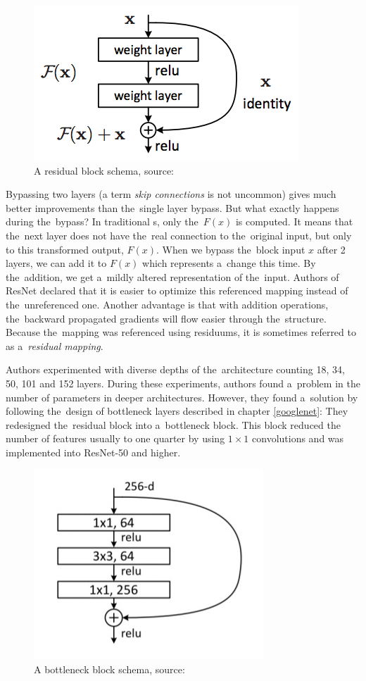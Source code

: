 \begin{figure}[H]
   \centering
	\includegraphics[width=0.4\linewidth]{./pictures/residual-block.png}
	\caption[Residual block]{A residual block schema, source: \cite{resnet}}
      \label{fig:res-block}
\end{figure}

Bypassing two layers (a term \textit{skip connections} is not uncommon) gives 
much better improvements than the~single layer bypass. But what exactly happens
during the~bypass? In traditional s, only the~$F(x)$ is computed. It 
means that the~next layer does not have the~real connection to the~original 
input, but only to this transformed output, $F(x)$. When we bypass the~block 
input $x$ after 2 layers, we can add it to $F(x)$ which represents a~change
this time. By the~addition, we get a~mildly altered representation of
the~input. Authors of ResNet declared that it is easier to optimize this
referenced mapping instead of the~unreferenced one. Another advantage is that
with addition operations, the~backward propagated gradients will flow easier
through the~structure. Because the~mapping was referenced using residuums, it
is sometimes referred to as a~\textit{residual mapping}.

Authors experimented with diverse depths of the~architecture counting 18, 34, 
50, 101 and 152 layers. During these experiments, authors found a~problem in
the number of parameters in deeper architectures. However, they found
a~solution by following the~design of bottleneck layers described in chapter
\ref{googlenet}: They redesigned the~residual block into a~bottleneck block.
This block reduced the number of features usually to one quarter by using
$1 \times 1$ convolutions and was implemented into ResNet-50 and higher.

\begin{figure}[H]
   \centering
	\includegraphics[width=0.4\linewidth]{./pictures/bottleneck-block.jpg}
	\caption[Bottleneck block]{A bottleneck block schema, source: \cite{resnet}}
      \label{fig:bottleneck-block}
\end{figure}


